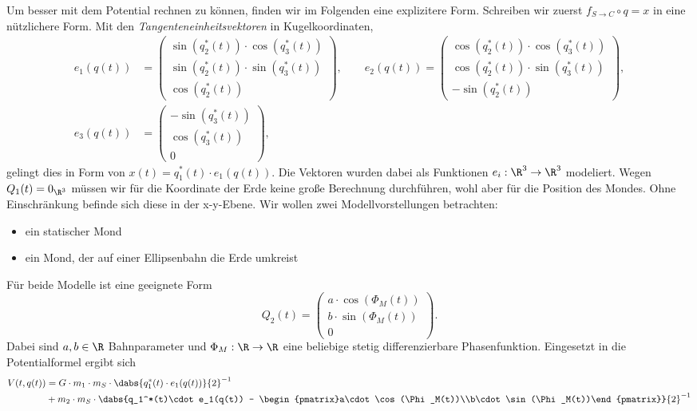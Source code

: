 \documentclass{subfiles}
\begin{document}
    Um besser mit dem Potential rechnen zu können, finden wir im Folgenden eine explizitere Form. Schreiben wir zuerst $f_{S\to C}\circ q = x$ in eine nützlichere Form. Mit den \textit{Tangenteneinheitsvektoren} in Kugelkoordinaten,
    \begin{align*}
        e_1(q(t)) &= \begin{pmatrix}\sin(q_2^*(t))\cdot\cos(q_3^*(t))\\ \sin(q_2^*(t))\cdot\sin(q_3^*(t))\\ \cos(q_2^*(t))\end{pmatrix},\qquad
        e_2(q(t)) = \begin{pmatrix}\cos(q_2^*(t))\cdot\cos(q_3^*(t))\\ \cos(q_2^*(t))\cdot\sin(q_3^*(t))\\ -\sin(q_2^*(t))\end{pmatrix},\\
        e_3(q(t)) &= \begin{pmatrix}-\sin(q_3^*(t))\\ \cos(q_3^*(t))\\ 0\end{pmatrix},
    \end{align*}
    gelingt dies in Form von $x(t) = q_1^*(t)\cdot e_1(q(t))$. Die Vektoren wurden dabei als Funktionen $e_i: \R^3\to \R^3$ modeliert. Wegen $Q_1(t)=0_{\R^3}$ müssen wir für die Koordinate der Erde keine große Berechnung durchführen, wohl aber für die Position des Mondes. Ohne Einschränkung befinde sich diese in der x-y-Ebene. Wir wollen zwei Modellvorstellungen betrachten:
    \begin{itemize}
        \item ein statischer Mond
        \item ein Mond, der auf einer Ellipsenbahn die Erde umkreist
    \end{itemize}
    Für beide Modelle ist eine geeignete Form
    \[
        Q_2(t) = \begin{pmatrix}a\cdot\cos(\Phi_M(t))\\b\cdot \sin(\Phi_M(t))\\ 0\end{pmatrix}.
    \]
    Dabei sind $a,b\in\R$ Bahnparameter und $\Phi_M: \R\to \R$ eine beliebige stetig differenzierbare Phasenfunktion. Eingesetzt in die Potentialformel ergibt sich
    \begin{align*}
        V(t,q(t)) &= G\cdot m_1\cdot m_S\cdot \dabs{q_1^*(t)\cdot e_1(q(t))}{2}^{-1}\\
        &+ m_2\cdot m_S\cdot\dabs{q_1^*(t)\cdot e_1(q(t)) - \begin{pmatrix}a\cdot\cos(\Phi_M(t))\\b\cdot \sin(\Phi_M(t))\end{pmatrix}}{2}^{-1}
    \end{align*}
\end{document}
